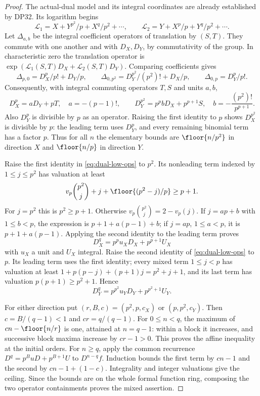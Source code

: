 \documentclass[11pt,a4paper]{article}
\theoremstyle{definition}\newtheorem{remark}[theorem]{Remark}
\begin{document}
\begin{proof}
The actual-dual model and its integral coordinates are already established by DP32. Its logarithm begins
\[
 \mathcal L_1=X+Y^{p^2}/p+X^q/p^2+\cdots,\qquad
 \mathcal L_2=Y+X^p/p+Y^q/p^2+\cdots.
\]
Let $\Delta_{a,b}$ be the integral coefficient operators of translation by $(S,T)$. They commute with one another and with $D_X,D_Y$, by commutativity of the group. In characteristic zero the translation operator is $\exp(\mathcal L_1(S,T)D_X+\mathcal L_2(S,T)D_Y)$. Comparing coefficients gives
\[
 \Delta_{p,0}=D_X^p/p!+D_Y/p,\qquad
 \Delta_{0,p^2}=D_Y^{p^2}/(p^2)!+D_X/p,\qquad
 \Delta_{0,p}=D_Y^p/p!.
\]
Consequently, with integral commuting operators $T,S$ and units $a,b$,
\begin{equation}\label{eq:dual-low-ops}
 D_X^p=aD_Y+pT,\quad a=-(p-1)!,\qquad
 D_Y^{p^2}=p^p bD_X+p^{p+1}S,\quad b=-\frac{(p^2)!}{p^{p+1}}.
\end{equation}
Also $D_Y^p$ is divisible by $p$ as an operator. Raising the first identity to $p$ shows $D_X^{p^2}$ is divisible by $p$: the leading term uses $D_Y^p$, and every remaining binomial term has a factor $p$. Thus for all $n$ the elementary bounds are $\floor{n/p^2}$ in direction $X$ and $\floor{n/p}$ in direction $Y$.

Raise the first identity in \eqref{eq:dual-low-ops} to $p^2$. Its nonleading term indexed by $1\le j\le p^2$ has valuation at least
\[
 v_p\binom{p^2}{j}+j+\floor{(p^2-j)/p}\ge p+1.
\]
For $j=p^2$ this is $p^2\ge p+1$. Otherwise $v_p\binom{p^2}{j}=2-v_p(j)$. If $j=ap+b$ with $1\le b<p$, the expression is $p+1+a(p-1)+b$; if $j=ap$, $1\le a<p$, it is $p+1+a(p-1)$. Applying the second identity to the leading term proves
\[
 D_X^q=p^p u_XD_X+p^{p+1}U_X
\]
with $u_X$ a unit and $U_X$ integral. Raise the second identity of \eqref{eq:dual-low-ops} to $p$. Its leading term uses the first identity; every mixed term $1\le j<p$ has valuation at least $1+p(p-j)+(p+1)j=p^2+j+1$, and its last term has valuation $p(p+1)\ge p^2+1$. Hence
\[
 D_Y^q=p^{p^2}u_YD_Y+p^{p^2+1}U_Y.
\]

For either direction put $(r,B,c)=(p^2,p,c_X)$ or $(p,p^2,c_Y)$. Then $c=B/(q-1)<1$ and $cr=q/(q-1)$. For $0\le n<q$, the maximum of $cn-\floor{n/r}$ is one, attained at $n=q-1$: within a block it increases, and successive block maxima increase by $cr-1>0$. This proves the affine inequality at the initial orders. For $n\ge q$, apply the common recurrence $D^q=p^BuD+p^{B+1}U$ to $D^{n-q}f$. Induction bounds the first term by $cn-1$ and the second by $cn-1+(1-c)$. Integrality and integer valuations give the ceiling. Since the bounds are on the whole formal function ring, composing the two operator containments proves the mixed assertion.


\end{proof}
\end{document}
